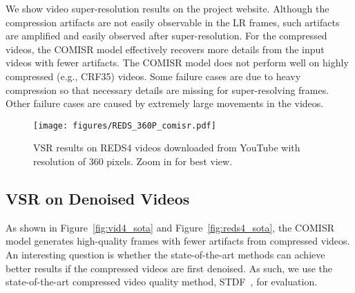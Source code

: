 \begin{table}[tp]
\vspace{1mm}
\caption{Performance evaluation using the LPIPS~\cite{zhang2018perceptual} metric (lower is better). Our method performs well, especially on the more challenging REDS4 dataset. 
}
\label{tbl:lpips}
\vspace{-2mm}
\end{table}

We show video super-resolution results on the project website. 
Although the compression artifacts are not easily observable in the LR frames, 
such artifacts are amplified and easily observed after super-resolution.
For the compressed videos, the COMISR model
effectively recovers more details from the input videos with fewer artifacts.
The COMISR model does not perform well on highly compressed (e.g., CRF35) videos. 
Some failure cases are due to heavy compression so that necessary details are missing for super-resolving frames.
Other failure cases are caused by extremely large movements 
in the videos.

\begin{figure*}[!htb]
\centering
\texttt{[image: figures/REDS\_360P\_comisr.pdf]}
\caption{ VSR results on REDS4 videos downloaded from YouTube with resolution of 360 pixels. Zoom in for best view.}
\label{fig:reds4_360p}
\vspace{-0.3cm}
\end{figure*}

\subsection{VSR on Denoised Videos}
\label{denosiervsr}
As shown in Figure~\ref{fig:vid4_sota} and Figure~\ref{fig:reds4_sota}, the COMISR model generates high-quality frames with fewer artifacts from compressed videos. 
An interesting question is whether the state-of-the-art methods can achieve better results if the compressed videos are first denoised. 
As such, we use the state-of-the-art compressed video quality method, STDF~\cite{stdf}, for evaluation.

